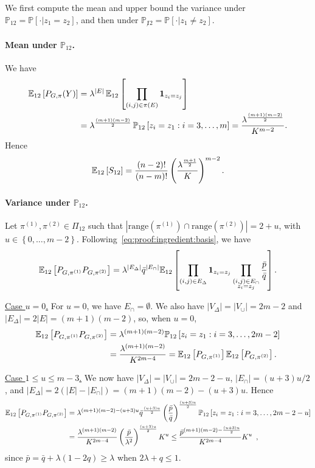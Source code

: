 \documentclass[final]{colt2026}
\newcommand{\1}{\mathbf{1}}
\newcommand{\bbE}{\mathbb{E}}
\newcommand{\bbP}{\mathbb{P}}
\newcommand{\pa}[1]{\left(#1\right)}
\newcommand{\ac}[1]{\left\{#1\right\}}
\newcommand{\cro}[1]{\left[#1\right]}
\begin{document}
We first compute the mean and upper bound the variance under $\bbP_{12}=\bbP\cro{\cdot|z_{1}=z_{2}}$, and then under
$\bbP_{\not 12}=\bbP\cro{\cdot|z_{1}\neq z_{2}}$. 

\paragraph{Mean under $\bbP_{12}$.}
We have 
\begin{align*}
\bbE_{12}\cro{P_{G,\pi}(Y)}&= \lambda^{|E|} \,\bbE_{12}\cro{\prod_{(i,j)\in \pi(E)}\mathbf 1_{z_{i}=z_{j}}}\\
&=\lambda^{(m+1)(m-2)\over 2} \,\bbP_{12}\cro{z_{i}=z_{1}:i=3,\ldots,m}={\lambda^{(m+1)(m-2)\over 2} \over K^{m-2}}.
\end{align*}
Hence
\begin{equation*}%
\bbE_{12}\cro{S_{12}}={(n-2)!\over (n-m)!} \pa{\lambda^{m+1\over 2} \over K}^{m-2}.
\end{equation*}

\paragraph{Variance under $\bbP_{12}$.}
Let $\pi^{(1)},\pi^{(2)}\in \Pi_{12}$ such that $|\text{range}(\pi^{(1)})\cap \text{range}(\pi^{(2)})|=2+u$, with $u\in \ac{0,\ldots,m-2}$.
Following~\eqref{eq:proof:ingredient:basis}, we have 
$$\bbE_{12}\cro{P_{G,\pi^{(1)}}P_{G,\pi^{(2)}}}=\lambda^{|E_{\Delta}|} \bar q^{|E_{\cap}|} \bbE_{12}\cro{\prod_{(i,j)\in E_{\Delta}}\mathbf 1_{z_{i}=z_{j}}\prod_{\substack{(i,j)\in E_{\cap}\\ z_{i}=z_{j}}}{\bar p\over \bar q}}.$$
\smallskip

\noindent\underline{Case $u=0$.} For $u=0$, we have  $E_{\cap}=\emptyset$. We also have $|V_{\Delta}|=|V_{\cup}|=2m-2$ and $|E_{\Delta}|=2|E|=(m+1)(m-2)$, so,
  when $u=0$,
\begin{align}
\bbE_{12}\cro{P_{G,\pi^{(1)}}P_{G,\pi^{(2)}}} & = \lambda^{(m+1)(m-2)} \bbP_{12}\cro{z_{i}=z_{1}:i=3,\ldots, 2m-2}\nonumber\\
& = {\lambda^{(m+1)(m-2)} \over K^{2m-4}}=
\bbE_{12}\cro{P_{G,\pi^{(1)}}}\bbE_{12}\cro{P_{G,\pi^{(2)}}}.\label{eq:var:u=0}
\end{align}
\smallskip

\noindent\underline{Case $1\leq u\leq m-3$.}
We now have $|V_{\Delta}|=|V_{\cup}|=2m-2-u$, $|E_{\cap}|=(u+3)u/2$, and $|E_{\Delta}|=2(|E|-|E_{\cap}|)=(m+1)(m-2)-(u+3)u$. Hence
\begin{align}
\bbE_{12}\cro{P_{G,\pi^{(1)}}P_{G,\pi^{(2)}}} & = \lambda^{(m+1)(m-2)-(u+3)u} {\bar q}^{(u+3)u\over 2} 
\pa{\bar p\over \bar q}^{(u+3)u\over 2} 
\bbP_{12}\cro{z_{i}=z_{1}:i=3,\ldots, 2m-2-u}\nonumber\\
&= {\lambda^{(m+1)(m-2)} \over K^{2m-4}}
\pa{\bar p\over \lambda^2}^{(u+3)u\over 2} {K}^{u} \leq {\bar p^{(m+1)(m-2)-{(u+3)u\over 2}} \over K^{2m-4}}
{K}^{u}\enspace ,\label{eq:var:generic:u}
\end{align}
since $\bar{p}= \bar q + \lambda (1-2q)\geq \lambda$ when $2\lambda+q\leq 1$. 
\end{document}

